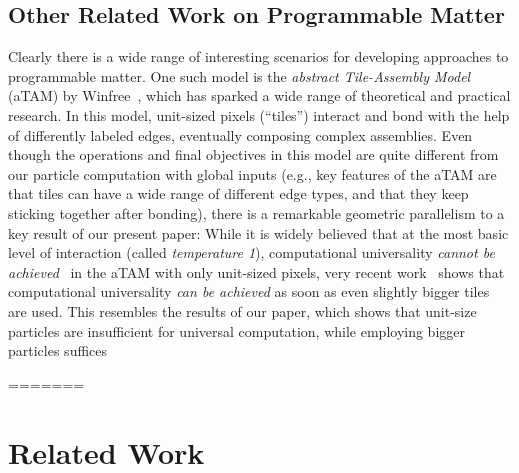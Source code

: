 \subsection{Other Related Work on Programmable Matter}
Clearly there is a wide range of interesting scenarios for developing approaches to programmable matter.
One such model is the \emph{abstract Tile-Assembly Model} (aTAM) by Winfree~\cite{Winf98,WLWS98,LaWiRe99}, which has 
sparked a wide range of theoretical and practical research. In this model, unit-sized pixels (``tiles'')
interact and bond with the help of differently labeled edges, eventually composing complex assemblies.
Even though the operations and final objectives in this model are quite different from our particle computation with global
inputs (e.g., key features of the aTAM are that tiles can have a wide range of different edge types, and
that they keep sticking together after bonding), there is
a remarkable geometric parallelism to a key result of our present paper:
While it is widely believed that at the most basic level of interaction (called {\em temperature 1}),
computational universality {\em cannot be achieved}~\cite{LSAT1,ManuchTemp1,IUNeedsCoop} in the aTAM with only unit-sized pixels, 
very recent work~\cite{fhp+-ucapt-15} shows that computational universality {\em can be achieved} as soon as even slightly bigger tiles are used. 
This resembles the results of our paper, which shows that unit-size particles are insufficient for universal computation, while employing bigger particles suffices

=======
\section{Related Work}\label{sec:RelatedWork}


